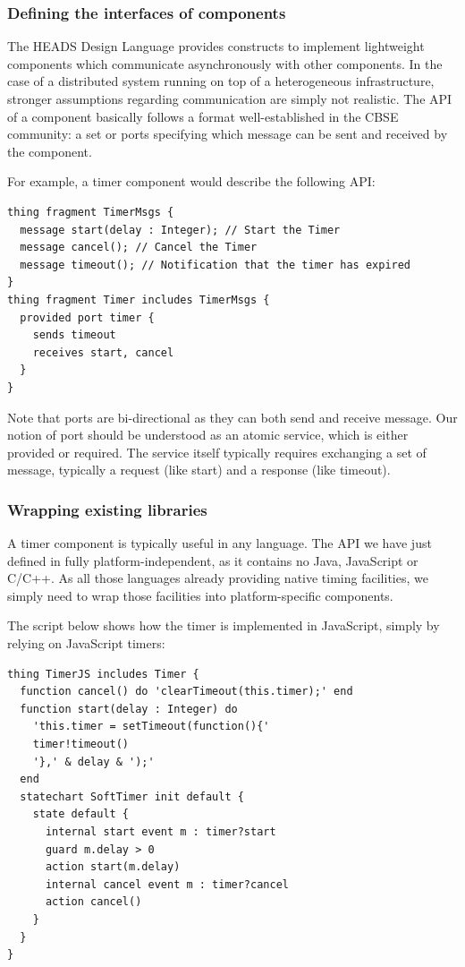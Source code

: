 \subsubsection{Defining the interfaces of components}

The HEADS Design Language provides constructs to implement lightweight components which communicate asynchronously with other components. In the case of a distributed system running on top of a heterogeneous infrastructure, stronger assumptions regarding communication are simply not realistic. The API of a component basically follows a format well-established in the CBSE community: a set or ports specifying which message can be sent and received by the component. 

For example, a timer component would describe the following API: 


\begin{lstlisting}
thing fragment TimerMsgs {  
  message start(delay : Integer); // Start the Timer 
  message cancel(); // Cancel the Timer  
  message timeout(); // Notification that the timer has expired 
} 
thing fragment Timer includes TimerMsgs {  
  provided port timer {  
    sends timeout  
    receives start, cancel 
  } 
}
\end{lstlisting}


Note that ports are bi-directional as they can both send and receive message. Our notion of port should be understood as an atomic service, which is either provided or required. The service itself typically requires exchanging a set of message, typically a request (like start) and a response (like timeout). 

\subsubsection{Wrapping existing libraries}
A timer component is typically useful in any language. The API we have just defined in fully platform-independent, as it contains no Java, JavaScript or C/C++. As all those languages already providing native timing facilities, we simply need to wrap those facilities into platform-specific components.  

The script below shows how the timer is implemented in JavaScript, simply by relying on JavaScript timers: 

\begin{lstlisting}
thing TimerJS includes Timer {  
  function cancel() do 'clearTimeout(this.timer);' end  
  function start(delay : Integer) do  
    'this.timer = setTimeout(function(){' 
    timer!timeout()  
    '},' & delay & ');'  
  end  
  statechart SoftTimer init default {  
    state default {  
      internal start event m : timer?start  
      guard m.delay > 0  
      action start(m.delay)  
      internal cancel event m : timer?cancel  
      action cancel()  
    }  
  }  
} 
\end{lstlisting}

